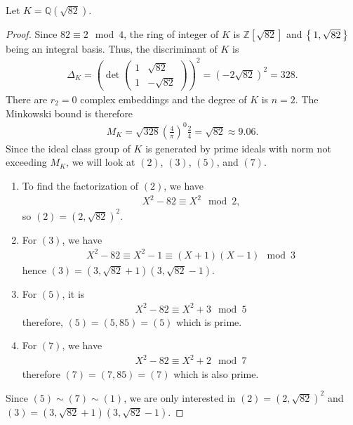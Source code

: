 \begin{example}
    Let \(K = \mathbb{Q}(\sqrt{82})\).
\end{example}
\begin{proof}
    Since \(82 \equiv 2 \mod{4}\), the ring of integer of \(K\) is \(\mathbb{Z}[\sqrt{82}]\) and \(\left\{\, 1, \sqrt{82} \,\right\}\) being an integral basis. Thus, the discriminant of \(K\) is
    \begin{align*}
        \Delta_K = \left(\det \begin{pmatrix}
            1 & \sqrt{82} \\
            1 & -\sqrt{82}
        \end{pmatrix}\right)^2
        = \left( -2 \sqrt{82} \right)^2
        = 328 \text{.}
    \end{align*}
    There are \(r_2 = 0\) complex embeddings and the degree of \(K\) is \(n = 2\). The Minkowski bound is therefore
    \begin{align*}
        M_K = \sqrt{328} \left(\frac{4}{\pi}\right)^0 \frac{2}{4} = \sqrt{82} \approx 9.06 \text{.}
    \end{align*}
    Since the ideal class group of \(K\) is generated by prime ideals with norm not exceeding \(M_K\), we will look at \((2)\), \((3)\), \((5)\), and \((7)\).
    \begin{enumerate}
        \item To find the factorization of \((2)\), we have
        \begin{align*}
            X^2 - 82 \equiv X^2 \mod{2} \text{,}
        \end{align*}
        so \((2) = (2, \sqrt{82})^2\).
        \item For \((3)\), we have
        \begin{align*}
            X^2 - 82 \equiv X^2 - 1 \equiv (X + 1) (X - 1) \mod{3}
        \end{align*}
        hence \((3) = (3, \sqrt{82} + 1) (3, \sqrt{82} - 1)\).
        \item For \((5)\), it is
        \begin{align*}
            X^2 - 82 \equiv X^2 + 3 \mod{5}
        \end{align*}
        therefore, \((5) = (5, 85) = (5)\) which is prime.
        \item For \((7)\), we have
        \begin{align*}
            X^2 - 82 \equiv X^2 + 2 \mod{7}
        \end{align*}
        therefore \((7) = (7, 85) = (7)\) which is also prime.
    \end{enumerate}
    Since \((5) \sim (7) \sim (1)\), we are only interested in \((2) = (2, \sqrt{82})^2\) and \((3) = (3, \sqrt{82} + 1)(3, \sqrt{82} - 1)\).


\end{proof}
